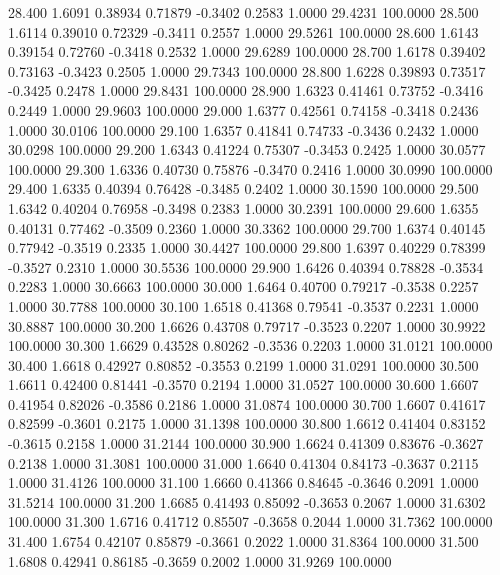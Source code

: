   28.400   1.6091   0.38934   0.71879  -0.3402   0.2583   1.0000  29.4231 100.0000
  28.500   1.6114   0.39010   0.72329  -0.3411   0.2557   1.0000  29.5261 100.0000
  28.600   1.6143   0.39154   0.72760  -0.3418   0.2532   1.0000  29.6289 100.0000
  28.700   1.6178   0.39402   0.73163  -0.3423   0.2505   1.0000  29.7343 100.0000
  28.800   1.6228   0.39893   0.73517  -0.3425   0.2478   1.0000  29.8431 100.0000
  28.900   1.6323   0.41461   0.73752  -0.3416   0.2449   1.0000  29.9603 100.0000
  29.000   1.6377   0.42561   0.74158  -0.3418   0.2436   1.0000  30.0106 100.0000
  29.100   1.6357   0.41841   0.74733  -0.3436   0.2432   1.0000  30.0298 100.0000
  29.200   1.6343   0.41224   0.75307  -0.3453   0.2425   1.0000  30.0577 100.0000
  29.300   1.6336   0.40730   0.75876  -0.3470   0.2416   1.0000  30.0990 100.0000
  29.400   1.6335   0.40394   0.76428  -0.3485   0.2402   1.0000  30.1590 100.0000
  29.500   1.6342   0.40204   0.76958  -0.3498   0.2383   1.0000  30.2391 100.0000
  29.600   1.6355   0.40131   0.77462  -0.3509   0.2360   1.0000  30.3362 100.0000
  29.700   1.6374   0.40145   0.77942  -0.3519   0.2335   1.0000  30.4427 100.0000
  29.800   1.6397   0.40229   0.78399  -0.3527   0.2310   1.0000  30.5536 100.0000
  29.900   1.6426   0.40394   0.78828  -0.3534   0.2283   1.0000  30.6663 100.0000
  30.000   1.6464   0.40700   0.79217  -0.3538   0.2257   1.0000  30.7788 100.0000
  30.100   1.6518   0.41368   0.79541  -0.3537   0.2231   1.0000  30.8887 100.0000
  30.200   1.6626   0.43708   0.79717  -0.3523   0.2207   1.0000  30.9922 100.0000
  30.300   1.6629   0.43528   0.80262  -0.3536   0.2203   1.0000  31.0121 100.0000
  30.400   1.6618   0.42927   0.80852  -0.3553   0.2199   1.0000  31.0291 100.0000
  30.500   1.6611   0.42400   0.81441  -0.3570   0.2194   1.0000  31.0527 100.0000
  30.600   1.6607   0.41954   0.82026  -0.3586   0.2186   1.0000  31.0874 100.0000
  30.700   1.6607   0.41617   0.82599  -0.3601   0.2175   1.0000  31.1398 100.0000
  30.800   1.6612   0.41404   0.83152  -0.3615   0.2158   1.0000  31.2144 100.0000
  30.900   1.6624   0.41309   0.83676  -0.3627   0.2138   1.0000  31.3081 100.0000
  31.000   1.6640   0.41304   0.84173  -0.3637   0.2115   1.0000  31.4126 100.0000
  31.100   1.6660   0.41366   0.84645  -0.3646   0.2091   1.0000  31.5214 100.0000
  31.200   1.6685   0.41493   0.85092  -0.3653   0.2067   1.0000  31.6302 100.0000
  31.300   1.6716   0.41712   0.85507  -0.3658   0.2044   1.0000  31.7362 100.0000
  31.400   1.6754   0.42107   0.85879  -0.3661   0.2022   1.0000  31.8364 100.0000
  31.500   1.6808   0.42941   0.86185  -0.3659   0.2002   1.0000  31.9269 100.0000
